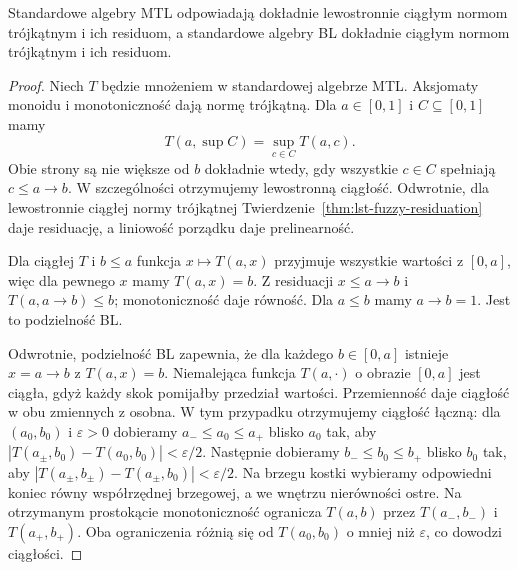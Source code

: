 \begin{stwierdzenie}
\label{prop:lst-fuzzy-standard-chains}
Standardowe algebry MTL odpowiadają dokładnie lewostronnie
ciągłym normom trójkątnym i ich residuom, a standardowe
algebry BL dokładnie ciągłym normom trójkątnym i ich residuom.
\end{stwierdzenie}
\begin{proof}
Niech $T$ będzie mnożeniem w standardowej algebrze MTL.
Aksjomaty monoidu i monotoniczność dają normę trójkątną.
Dla $a\in[0,1]$ i $C\subseteq[0,1]$ mamy
\[
 T(a,\sup C)=\sup_{c\in C}T(a,c).
\]
Obie strony są nie większe od $b$ dokładnie wtedy,
gdy wszystkie $c\in C$ spełniają $c\leq a\to b$.
W szczególności otrzymujemy lewostronną ciągłość.
Odwrotnie, dla lewostronnie ciągłej normy trójkątnej
Twierdzenie~\ref{thm:lst-fuzzy-residuation} daje residuację,
a liniowość porządku daje prelinearność.

Dla ciągłej $T$ i $b\leq a$ funkcja $x\mapsto T(a,x)$
przyjmuje wszystkie wartości z $[0,a]$, więc dla pewnego $x$
mamy $T(a,x)=b$. Z residuacji $x\leq a\to b$ i
$T(a,a\to b)\leq b$; monotoniczność daje równość.
Dla $a\leq b$ mamy $a\to b=1$. Jest to podzielność BL.

Odwrotnie, podzielność BL zapewnia, że dla każdego
$b\in[0,a]$ istnieje $x=a\to b$ z $T(a,x)=b$.
Niemalejąca funkcja $T(a,\cdot)$ o obrazie $[0,a]$
jest ciągła, gdyż każdy skok pomijałby przedział wartości.
Przemienność daje ciągłość w obu zmiennych z osobna.
W tym przypadku otrzymujemy ciągłość łączną: dla
$(a_0,b_0)$ i $\varepsilon>0$ dobieramy $a_-\leq a_0\leq a_+$
blisko $a_0$ tak, aby
$|T(a_\pm,b_0)-T(a_0,b_0)|<\varepsilon/2$.
Następnie dobieramy $b_-\leq b_0\leq b_+$ blisko $b_0$ tak,
aby $|T(a_\pm,b_\pm)-T(a_\pm,b_0)|<\varepsilon/2$.
Na brzegu kostki wybieramy odpowiedni koniec równy
współrzędnej brzegowej, a we wnętrzu nierówności ostre.
Na otrzymanym prostokącie monotoniczność ogranicza
$T(a,b)$ przez $T(a_-,b_-)$ i $T(a_+,b_+)$.
Oba ograniczenia różnią się od $T(a_0,b_0)$ o mniej niż
$\varepsilon$, co dowodzi ciągłości.
\end{proof}

